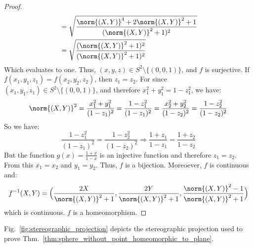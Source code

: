 \documentclass[crop=false,class=book,oneside]{standalone}                      %
\begin{document}
\begin{proof}
\begin{subequations}
\begin{align}
                        &=\sqrt{\frac{\norm{(X,Y)}^{4}+2\norm{(X,Y)}^{2}+1}
                                     {(\norm{(X,Y)}^{2}+1)^{2}}}\\
                        &=\sqrt{%
                            \frac{(\norm{(X,Y)}^{2}+1)^{2}}
                                 {(\norm{(X,Y)}^{2}+1)^{2}}%
                        }
                    \end{align}
                \end{subequations}
                Which evaluates to one. Thus,
                $(x,y,z)\in S^{2}\setminus\{(0,0,1)\}$, and $f$ is surjective.
                If $f(x_{1},y_{1},z_{1})=f(x_{2},y_{2},z_{2})$, then
                $z_{1}=z_{2}$. For since
                $(x_{1},y_{1},z_{1})\in S^{2}\setminus\{(0,0,1)\}$,
                and therefore $x_{1}^{2}+y_{1}^{2}=1-z_{1}^{2}$, we have:
                \begin{equation}
                    \norm{(X,Y)}^{2}
                    =\frac{x_{1}^2+y_{1}^2}{(1-z_{1})^{2}}
                    =\frac{1-z_{1}^{2}}{(1-z_{1})^{2}}
                    =\frac{x_{2}^{2}+y_{2}^{2}}{(1-z_{2})^{2}}
                    =\frac{1-z_{2}^{2}}{(1-z_{2})^{2}}
                \end{equation}
                So we have:
                \begin{equation}
                    \frac{1-z_{1}^{2}}{(1-z_{1})^{2}}
                    =\frac{1-z_{2}^{2}}{(1-z_{2})^{2}}
                    \Rightarrow
                    \frac{1+z_{1}}{1-z_{1}}
                    =\frac{1+z_{2}}{1-z_{2}}
                \end{equation}
                But the function $g(x)=\frac{1+x}{1-x}$ is an injective function
                and therefore $z_{1}=z_{2}$. From this $x_{1}=x_{2}$ and
                $y_{1}=y_{2}$. Thus, $f$ is a bijection. Moreoever,
                $f$ is continuous and:
                \begin{equation}
                    f^{-1}(X,Y)
                    =\Big(\frac{2X}{\norm{(X,Y)}^{2}+1},
                        \frac{2Y}{\norm{(X,Y)}^{2}+1},
                        \frac{\norm{(X,Y)}^{2}-1}{\norm{(X,Y)}^{2}+1}\Big)
                \end{equation}
                which is continuous. $f$ is a homeomorphism.
            \end{proof}
            Fig.~\ref{fig:stereographic_projection} depicts the stereographic
            projection used to prove
            Thm.~\ref{thm:sphere_without_point_homeomorphic_to_plane}.
\end{document}
